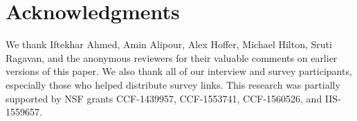 \section*{Acknowledgments}

We thank Iftekhar Ahmed, Amin Alipour, Alex Hoffer, Michael Hilton, Sruti Ragavan, and the anonymous reviewers for their valuable comments on earlier versions of this paper.
We also thank all of our interview and survey participants, especially those who helped distribute survey links.
This research was partially supported by NSF grants CCF-1439957, CCF-1553741, CCF-1560526, and IIS-1559657.
